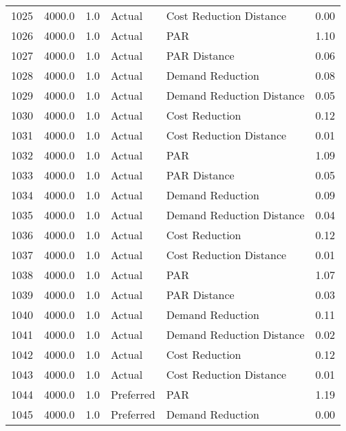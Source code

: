 \begin{longtable}{lrrllr}
1025 &       4000.0 &     1.0 &         Actual &    Cost Reduction Distance &   0.00 \\
1026 &       4000.0 &     1.0 &         Actual &                        PAR &   1.10 \\
1027 &       4000.0 &     1.0 &         Actual &               PAR Distance &   0.06 \\
1028 &       4000.0 &     1.0 &         Actual &           Demand Reduction &   0.08 \\
1029 &       4000.0 &     1.0 &         Actual &  Demand Reduction Distance &   0.05 \\
1030 &       4000.0 &     1.0 &         Actual &             Cost Reduction &   0.12 \\
1031 &       4000.0 &     1.0 &         Actual &    Cost Reduction Distance &   0.01 \\
1032 &       4000.0 &     1.0 &         Actual &                        PAR &   1.09 \\
1033 &       4000.0 &     1.0 &         Actual &               PAR Distance &   0.05 \\
1034 &       4000.0 &     1.0 &         Actual &           Demand Reduction &   0.09 \\
1035 &       4000.0 &     1.0 &         Actual &  Demand Reduction Distance &   0.04 \\
1036 &       4000.0 &     1.0 &         Actual &             Cost Reduction &   0.12 \\
1037 &       4000.0 &     1.0 &         Actual &    Cost Reduction Distance &   0.01 \\
1038 &       4000.0 &     1.0 &         Actual &                        PAR &   1.07 \\
1039 &       4000.0 &     1.0 &         Actual &               PAR Distance &   0.03 \\
1040 &       4000.0 &     1.0 &         Actual &           Demand Reduction &   0.11 \\
1041 &       4000.0 &     1.0 &         Actual &  Demand Reduction Distance &   0.02 \\
1042 &       4000.0 &     1.0 &         Actual &             Cost Reduction &   0.12 \\
1043 &       4000.0 &     1.0 &         Actual &    Cost Reduction Distance &   0.01 \\
1044 &       4000.0 &     1.0 &      Preferred &                        PAR &   1.19 \\
1045 &       4000.0 &     1.0 &      Preferred &           Demand Reduction &   0.00 \\

\end{longtable}
